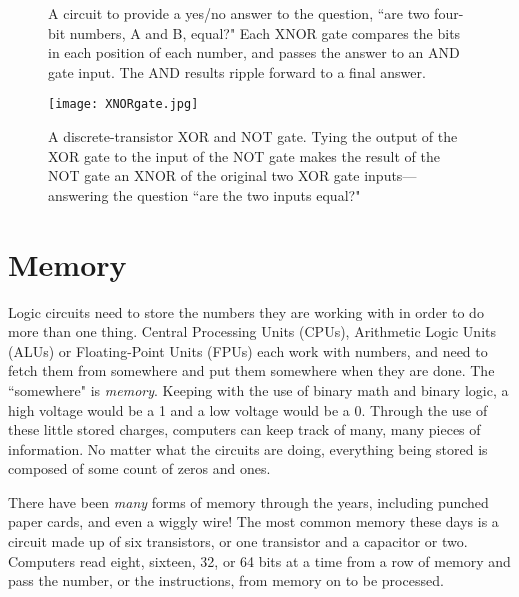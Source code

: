 \begin{figure}[h!]
\begin{center}

\caption{A circuit to provide a yes/no answer to the question, ``are  two four-bit numbers, A and B, equal?" Each XNOR gate compares the bits in each position of each number, and passes the answer to an AND gate input. The AND results ripple forward to a final answer.}
\end{center}
\end{figure}

\begin{figure}[hb!]
\begin{center}
\texttt{[image: XNORgate.jpg]}
\caption{A discrete-transistor XOR and NOT gate. Tying the output of the XOR gate to the input of the NOT gate makes the result of the NOT gate an XNOR of the original two XOR gate inputs---answering the question ``are the two inputs equal?"}
\end{center}
\end{figure}

\clearpage


\newpage
\section*{Memory}

Logic circuits need to store the numbers they are working with in order to do more than one thing. Central Processing Units (CPUs), Arithmetic Logic Units (ALUs) or Floating-Point Units (FPUs) each work with numbers, and need to fetch them from somewhere and put them somewhere when they are done. The ``somewhere" is \emph{memory}. Keeping with the use of binary math and binary logic, a high voltage would be a 1 and a low voltage would be a 0. Through the use of these little stored charges, computers can keep track of many, many pieces of information. No matter what the circuits are doing, everything being stored is composed of some count of zeros and ones. 

There have been \emph{many} forms of memory through the years, including punched paper cards, and even a wiggly wire! The most common memory these days is a circuit made up of six transistors, or one transistor and a capacitor or two. Computers read eight, sixteen, 32, or 64 bits at a time from a row of memory and pass the number, or the instructions, from memory on to be processed.

